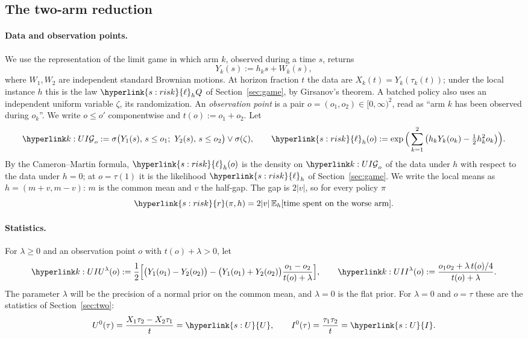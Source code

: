 \documentclass[11pt]{article}
\newcommand{\dt}[1]{\hypertarget{#1}{}}
\DeclareRobustCommand{\sy}[2]{{\hyperlink{#1}{#2}}}
\newcommand{\E}{\mathbb{E}}
\newcommand{\1}{\mathbf{1}}
\newcommand{\rk}{\sy{s:risk}{r}}
\newcommand{\lh}{\sy{s:risk}{\ell}}
\newcommand{\Ud}{\sy{s:U}{U}}
\newcommand{\Id}{\sy{s:U}{I}}
\begin{document}
\subsection{The two-arm reduction}\label{sec:K2-red}

\paragraph{Data and observation points.} We use the representation of the limit game in which arm $k$, observed during a time $s$, returns
\[
Y_k(s):=h_ks+W_k(s),
\]
where $W_1,W_2$ are independent standard Brownian motions. At horizon fraction $t$ the data are $X_k(t)=Y_k(\tau_k(t))$; under the local instance $h$ this is the
law $\lh_hQ$ of Section~\ref{sec:game}, by Girsanov's theorem. A batched policy also uses an independent uniform variable $\zeta$, its randomization.
An \emph{observation point} is a pair $o=(o_1,o_2)\in[0,\infty)^2$, read as ``arm $k$ has been observed during $o_k$''. We write $o\le o'$ componentwise and
$t(o):=o_1+o_2$. Let
\[
\kF_o:=\sigma\big(Y_1(s),\,s\le o_1;\ Y_2(s),\,s\le o_2\big)\vee\sigma(\zeta),\qquad
\lh_h(o):=\exp\Big(\sum_{k=1}^2\big(h_kY_k(o_k)-\tfrac12h_k^2o_k\big)\Big).
\]
By the Cameron--Martin formula, $\lh_h(o)$ is the density on $\kF_o$ of the data under $h$ with respect to the data under $h=0$; at $o=\tau(1)$ it is the
likelihood $\lh_h$ of Section~\ref{sec:game}. We write the local means as $h=(m+v,m-v)$: $m$ is the common mean and $v$ the half-gap. The gap is $2|v|$, so for
every policy $\pi$
\[
\rk(\pi,h)=2|v|\,\E_h[\text{time spent on the worse arm}].
\]

\paragraph{Statistics.}\dt{k:UI} For $\lambda\ge0$ and an observation point $o$ with $t(o)+\lambda>0$, let
\[
\kU(o):=\frac12\Big[\big(Y_1(o_1)-Y_2(o_2)\big)-\big(Y_1(o_1)+Y_2(o_2)\big)\frac{o_1-o_2}{t(o)+\lambda}\Big],\qquad
\kI(o):=\frac{o_1o_2+\lambda\,t(o)/4}{t(o)+\lambda}.
\]
The parameter $\lambda$ will be the precision of a normal prior on the common mean, and $\lambda=0$ is the flat prior. For $\lambda=0$ and $o=\tau$ these are the
statistics of Section~\ref{sec:two}:
\[
U^0(\tau)=\frac{X_1\tau_2-X_2\tau_1}{t}=\Ud,\qquad I^0(\tau)=\frac{\tau_1\tau_2}{t}=\Id .
\]
\end{document}
